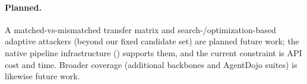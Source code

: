 \paragraph{Planned.} A matched-vs-mismatched transfer matrix and search-/optimization-based adaptive attackers (beyond our fixed candidate set) are planned future work; the native pipeline infrastructure () supports them, and the current constraint is API cost and time. Broader coverage (additional backbones and AgentDojo suites) is likewise future work.
